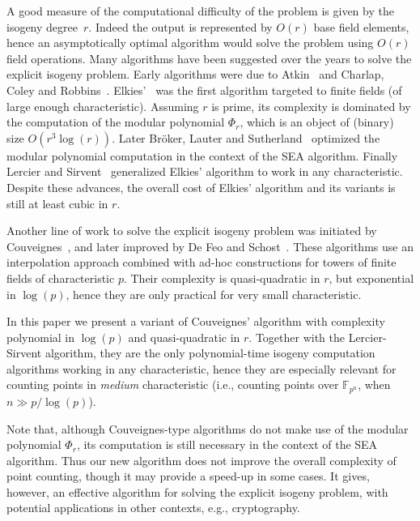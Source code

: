 \documentclass{lms}
\newcommand{\F}{\mathbb{F}}
\begin{document}
A good measure of the computational difficulty of the problem is given
by the isogeny degree~$r$. Indeed the output is represented by
$O(r)$ base field elements, hence an asymptotically optimal algorithm
would solve the problem using $O(r)$ field operations. Many algorithms
have been suggested over the years to solve the explicit isogeny
problem. Early algorithms were due to Atkin~\cite{atkin91} and
Charlap, Coley and
Robbins~\cite{charlap1991enumeration}. Elkies'~\cite{elkies92,elkies98,Bostan}
was the first algorithm targeted to finite fields (of large enough
characteristic). Assuming $r$ is prime, its complexity is dominated by
the computation of the modular polynomial $\Phi_r$, which is an object
of (binary) size $O(r^3\log(r))$. Later Bröker, Lauter and
Sutherland~\cite{sutherland10:modpol} optimized the modular polynomial
computation in the context of the SEA
algorithm. Finally Lercier and Sirvent~\cite{lercier+sirvent08,1602.00244}
generalized Elkies' algorithm to work in any characteristic. Despite
these advances, the overall cost of Elkies' algorithm and its
variants is still at least cubic in $r$.

Another line of work to solve the explicit isogeny problem was
initiated by Couveignes~\cite{couveignes94,couveignes96,couveignes00},
and later improved by De Feo and Schost~\cite{df10,df+schost12}. These
algorithms use an interpolation approach combined with ad-hoc
constructions for towers of finite fields of characteristic $p$. Their
complexity is quasi-quadratic in $r$, but exponential in $\log(p)$,
hence they are only practical for very small characteristic.

In this paper we present a variant of Couveignes' algorithm with
complexity polynomial in $\log(p)$ and quasi-quadratic in $r$. Together
with the Lercier-Sirvent algorithm, they are the only polynomial-time
isogeny computation algorithms working in any characteristic, hence
they are especially relevant for counting points in \emph{medium}
characteristic (i.e., counting points over $\F_{p^n}$, when
$n\gg p/\log (p)$).

Note that, although Couveignes-type algorithms do not make use of the
modular polynomial $\Phi_r$, its computation is still necessary in the
context of the SEA algorithm. Thus our new algorithm does not improve
the overall complexity of point counting, though it may provide a 
speed-up in some cases. It
gives, however, an effective algorithm for solving the explicit
isogeny problem, with potential applications in other contexts, e.g.,
cryptography.
\end{document}
